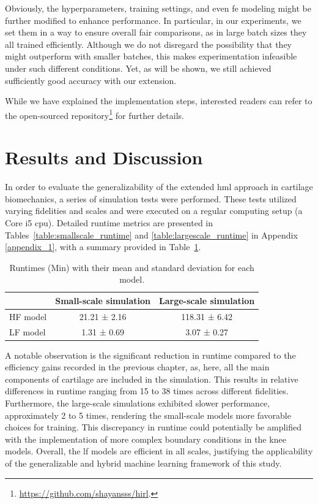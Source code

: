 Obviously, the hyperparameters, training settings, and even \ac{fe} modeling might be further modified to enhance performance. In particular, in our experiments, we set them in a way to ensure overall fair comparisons, as in large batch sizes they all trained efficiently. Although we do not disregard the possibility that they might outperform with smaller batches, this makes experimentation infeasible under such different conditions. Yet, as will be shown, we still achieved sufficiently good accuracy with our extension.

While we have explained the implementation steps, interested readers can refer to the open-sourced repository\footnote{\href{https://github.com/shayansss/hirl}{https://github.com/shayansss/hirl}.} for further details.

\section{Results and Discussion}
%
In order to evaluate the generalizability of the extended \ac{hml} approach in cartilage biomechanics, a series of simulation tests were performed. These tests utilized varying fidelities and scales and were executed on a regular computing setup (a Core i5 \ac{cpu}). Detailed runtime metrics are presented in Tables~\ref{table:smallscale_runtime} and \ref{table:largescale_runtime} in Appendix \ref{appendix_1}, with a summary provided in Table~\ref{tabel:runtimes_stats}.
%
\begin{table}[H]
\caption{Runtimes (Min) with their mean and standard deviation for each model.}\centering
\label{tabel:runtimes_stats}
\begin{tabular}{lcc}
\toprule
 & \textbf{Small-scale simulation} & \textbf{Large-scale simulation} \\
\midrule
HF model & 21.21 ± 2.16 & 118.31 ± 6.42 \\
LF model & 1.31 ± 0.69 & 3.07 ± 0.27 \\
\bottomrule
\end{tabular}
\end{table}

A notable observation is the significant reduction in runtime compared to the efficiency gains recorded in the previous chapter, as, here, all the main components of cartilage are included in the simulation. This results in relative differences in runtime ranging from 15 to 38 times across different fidelities. Furthermore, the large-scale simulations exhibited slower performance, approximately 2 to 5 times, rendering the small-scale models more favorable choices for training. This discrepancy in runtime could potentially be amplified with the implementation of more complex boundary conditions in the knee models. Overall, the \ac{lf} models are efficient in all scales, justifying the applicability of the generalizable and hybrid machine learning framework of this study.

